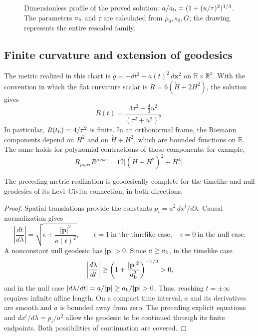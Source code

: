 \begin{figure}[htbp]
\centering
{}
\caption{Dimensionless profile of the proved solution:
\(a/a_{\rm b}=(1+(u/\tau)^2)^{1/3}\).
The parameters \(a_{\rm b}\) and \(\tau\) are calculated from
\(\rho_0,s_0,G\); the drawing represents the entire rescaled family.}
\label{vii:vii:fig:rebote-polvo}
\end{figure}

\subsection{Finite curvature and extension of geodesics}
The metric realized in this chart is
\(g=-dt^2+a(t)^2\,d\mathbf x^2\) on
\(\mathbb R\times\mathbb R^3\). With the convention in which
the flat curvature scalar is \(R=6(\dot H+2H^2)\), the solution gives
\[
 R(t)=\frac{4\tau^2+\frac43u^2}{(\tau^2+u^2)^2}.
\]
In particular, \(R(t_{\rm b})=4/\tau^2\) is finite.
In an orthonormal frame, the Riemann components depend on
\(H^2\) and on \(\dot H+H^2\), which are bounded functions on
\(\mathbb R\). The same holds for polynomial contractions
of those components; for example,
\[
 R_{\mu\nu\rho\sigma}R^{\mu\nu\rho\sigma}
 =12\bigl[(\dot H+H^2)^2+H^4\bigr].
\]

\begin{proposition}
\label{vii:vii:prop:completitud-causal-polvo}
The preceding metric realization is geodesically complete
for the timelike and null geodesics of its Levi--Civita
connection, in both directions.
\end{proposition}
\begin{proof}
Spatial translations provide the constants
\(p_i=a^2\,dx^i/d\lambda\). Causal normalization gives
\[
 \left|\frac{dt}{d\lambda}\right|
 =\sqrt{\epsilon+\frac{|\mathbf p|^2}{a(t)^2}},
 \qquad \epsilon=1\ \text{in the timelike case},\quad
 \epsilon=0\ \text{in the null case}.
\]
A nonconstant null geodesic has \(|\mathbf p|>0\).
Since \(a\geq a_{\rm b}\), in the timelike case
\[
 \left|\frac{d\lambda}{dt}\right|
 \geq\left(1+\frac{|\mathbf p|^2}{a_{\rm b}^2}\right)^{-1/2}>0,
\]
and in the null case
\(\left|d\lambda/dt\right|=a/|\mathbf p|
 \geq a_{\rm b}/|\mathbf p|>0\).
Thus, reaching \(t=\pm\infty\) requires infinite affine length.
On a compact time interval, \(a\) and its derivatives are
smooth and \(a\) is bounded away from zero. The preceding explicit
equations and \(dx^i/d\lambda=p_i/a^2\) allow the
geodesic to be continued through its finite endpoints. Both
possibilities of continuation are covered.
\end{proof}

